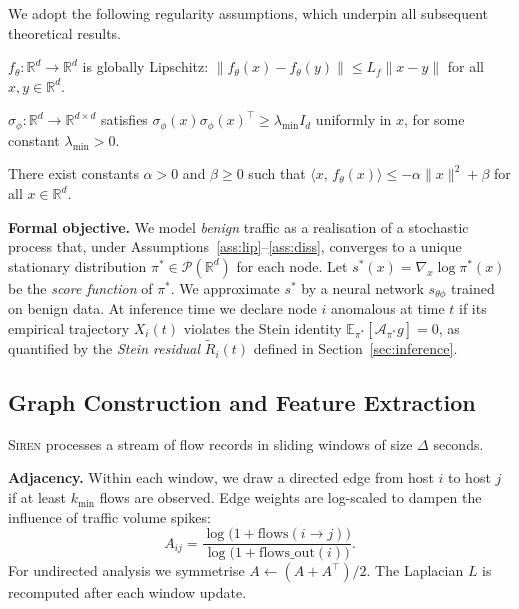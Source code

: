 We adopt the following regularity assumptions, which underpin all subsequent
theoretical results.

\begin{assumption}\label{ass:lip}
$f_\theta : \mathbb{R}^d \to \mathbb{R}^d$ is globally Lipschitz:
$\|f_\theta(x) - f_\theta(y)\| \le L_f \|x - y\|$ for all $x, y \in \mathbb{R}^d$.
\end{assumption}

\begin{assumption}\label{ass:nondeg}
$\sigma_\phi : \mathbb{R}^d \to \mathbb{R}^{d \times d}$ satisfies
$\sigma_\phi(x)\sigma_\phi(x)^{\!\top} \ge \lambda_{\min} I_d$ uniformly in
$x$, for some constant $\lambda_{\min} > 0$.
\end{assumption}

\begin{assumption}[Dissipativity]\label{ass:diss}
There exist constants $\alpha > 0$ and $\beta \ge 0$ such that
$\langle x,\, f_\theta(x) \rangle \le -\alpha\|x\|^2 + \beta$
for all $x \in \mathbb{R}^d$.
\end{assumption}

\textbf{Formal objective.}  We model \emph{benign} traffic as a realisation
of a stochastic process that, under Assumptions~\ref{ass:lip}--\ref{ass:diss},
converges to a unique stationary distribution $\pi^* \in \mathcal{P}(\mathbb{R}^d)$
for each node.  Let $s^*(x) = \nabla_x \log \pi^*(x)$ be the
\emph{score function} of $\pi^*$.  We approximate $s^*$ by a neural network
$s_{\theta\phi}$ trained on benign data.  At inference time we declare node
$i$ anomalous at time $t$ if its empirical trajectory $X_i(t)$ violates the
Stein identity $\mathbb{E}_{\pi^*}[\mathcal{A}_{\pi^*} g] = 0$, as quantified
by the \emph{Stein residual} $\tilde{R}_i(t)$ defined in
Section~\ref{sec:inference}.

\subsection{Graph Construction and Feature Extraction}
\label{sec:graph}

\textsc{Siren} processes a stream of flow records in sliding windows of size
$\Delta$ seconds.

\textbf{Adjacency.}  Within each window, we draw a directed edge from host
$i$ to host $j$ if at least $k_{\min}$ flows are observed.  Edge weights are
log-scaled to dampen the influence of traffic volume spikes:
\begin{equation}\label{eq:weight}
A_{ij}
= \frac{\log\!\bigl(1 + \mathrm{flows}(i\to j)\bigr)}
       {\log\!\bigl(1 + \mathrm{flows\_out}(i)\bigr)}.
\end{equation}
For undirected analysis we symmetrise $A \leftarrow (A + A^\top)/2$.
The Laplacian $L$ is recomputed after each window update.

